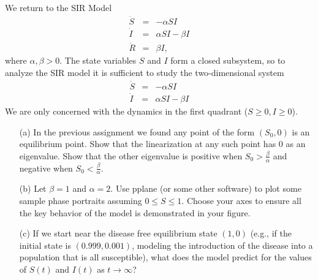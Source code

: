 \documentclass[11pt,letterpaper,boxed]{hmcpset}
\begin{document}
\begin{solution}
\vfill
\end{solution}
\newpage


\begin{problem}[4.]  We return to  the SIR Model 
\begin{eqnarray}
\label{s2} \nonumber
\dot{S}& = & -\alpha S I \\
\label{i2} \nonumber
\dot{I} & = & \alpha S I - \beta I \\
\dot{R} & = & \beta I,  \nonumber
\end{eqnarray}
where $\alpha, \beta > 0$.  The state variables  $S$ and $I$  form a closed subsystem, so to analyze the SIR model it is sufficient to study the two-dimensional system
\begin{eqnarray}
\label{s}
\dot{S} & = & -\alpha S I \\
\label{i}
\dot{I} & = & \alpha S I - \beta I 
\end{eqnarray}
We are only concerned with the dynamics  in the first quadrant ($S \geq 0, I \geq 0$). 
\begin{enumerate}
\item[(a)] In the previous assignment we found any point of the form $(S_0,0)$ is an equilibrium point. Show that the linearization at any such point has $0$ as an eigenvalue.  Show that the other eigenvalue is positive when $S_0 > \frac{\beta}{\alpha}$ and negative when $S_0 < \frac{\beta}{\alpha}$.  
\item[(b)] Let $\beta =1$ and $\alpha = 2$. Use pplane (or some other software) to plot some sample  phase portraits  assuming $0 \leq S \leq 1$. Choose your axes to ensure all the key behavior of the model is demonstrated in your figure. 
\item[(c)] If we start near the disease free equilibrium state $(1,0)$ (e.g., if the initial state is $(0.999,0.001)$, modeling the introduction of the disease into a population that is all susceptible), what does the model predict for the values of $S(t)$ and $I(t)$ as $t \to \infty$? 
\end{enumerate}


\end{problem}
\end{document}
